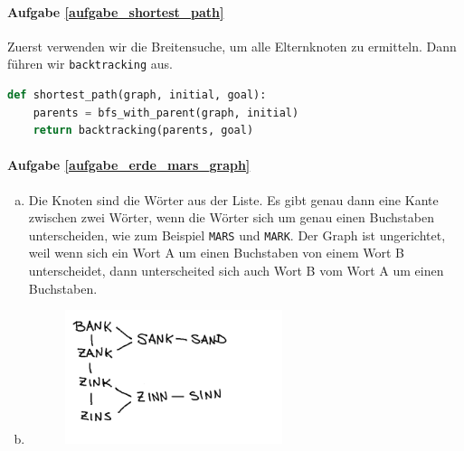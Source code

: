 \paragraph{Aufgabe \ref{aufgabe_shortest_path}}
Zuerst verwenden wir die Breitensuche, um alle Elternknoten zu ermitteln. Dann führen wir \texttt{backtracking} aus.
\begin{lstlisting}[language=Python]
def shortest_path(graph, initial, goal):
    parents = bfs_with_parent(graph, initial)
    return backtracking(parents, goal)
\end{lstlisting}

\paragraph{Aufgabe \ref{aufgabe_erde_mars_graph}}
\begin{enumerate}[(a)]
    \item Die Knoten sind die Wörter aus der Liste. Es gibt genau dann eine Kante zwischen zwei Wörter, wenn die Wörter sich um genau einen Buchstaben unterscheiden, wie zum Beispiel \texttt{MARS} und \texttt{MARK}. Der Graph ist ungerichtet, weil wenn sich ein Wort A um einen Buchstaben von einem Wort B unterscheidet, dann unterscheited sich auch Wort B vom Wort A um einen Buchstaben.
    \item
    \begin{figure}[H]
    \centering
    \includegraphics[width=0.6\textwidth]{Pictures/SP/bank_zins.png}
\end{figure}
\end{enumerate}

